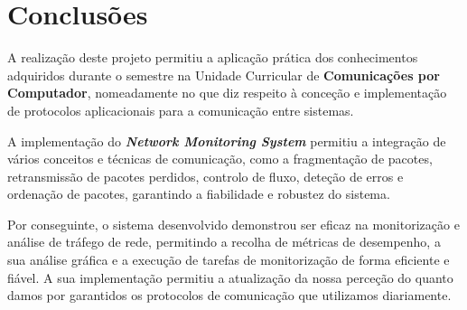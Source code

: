 \documentclass[a4paper,12pt]{scrreprt}
\begin{document}
\section{Conclusões}

A realização deste projeto permitiu a aplicação prática dos conhecimentos adquiridos
durante o semestre na Unidade Curricular de \textbf{Comunicações por Computador},
nomeadamente no que diz respeito à conceção e implementação de protocolos aplicacionais
para a comunicação entre sistemas.

A implementação do \textbf{\textit{Network Monitoring System}} permitiu a integração de
vários conceitos e técnicas de comunicação, como a fragmentação de pacotes, retransmissão
de pacotes perdidos, controlo de fluxo, deteção de erros e ordenação de pacotes, garantindo
a fiabilidade e robustez do sistema.

Por conseguinte, o sistema desenvolvido demonstrou ser eficaz na monitorização e
análise de tráfego de rede, permitindo a recolha de métricas de
desempenho, a sua análise gráfica e a execução de tarefas de monitorização de forma
eficiente e fiável. A sua implementação permitiu a atualização da nossa perceção
do quanto damos por garantidos os protocolos de comunicação que utilizamos diariamente.

\end{document}
